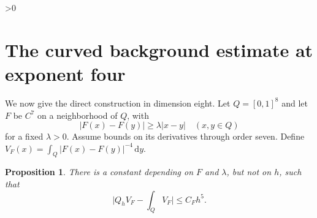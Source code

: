 \documentclass[11pt,a4paper]{article}
\newtheorem{proposition}[theorem]{Proposition}
\theoremstyle{definition}
\newcommand{\dd}{\,\mathrm d}
\newcommand{\abs}[1]{\lvert#1\rvert}
\numberwithin{equation}{section}
\let\originalsection\section
\renewcommand{\section}{\ifnum\value{section}>0\clearpage\fi\originalsection}
\begin{document}
\section{The curved background estimate at exponent four}\label{sec:backgroundfour}
We now give the direct construction in dimension eight. Let $Q=[0,1]^8$ and let $F$ be $C^7$ on a neighborhood of $Q$, with
\begin{equation}\label{eq:bilip}
 \abs{F(x)-F(y)}\ge\lambda\abs{x-y}\quad(x,y\in Q)
\end{equation}
for a fixed $\lambda>0$. Assume bounds on its derivatives through order seven. Define $V_F(x)=\int_Q\abs{F(x)-F(y)}^{-4}\dd y$.

\begin{proposition}\label{prop:backgroundfour}
There is a constant depending on $F$ and $\lambda$, but not on $h$, such that
\begin{equation}\label{eq:bgfour}
 \abs{Q_hV_F-\int_QV_F}\le C_Fh^5.
\end{equation}
\end{proposition}
\end{document}
